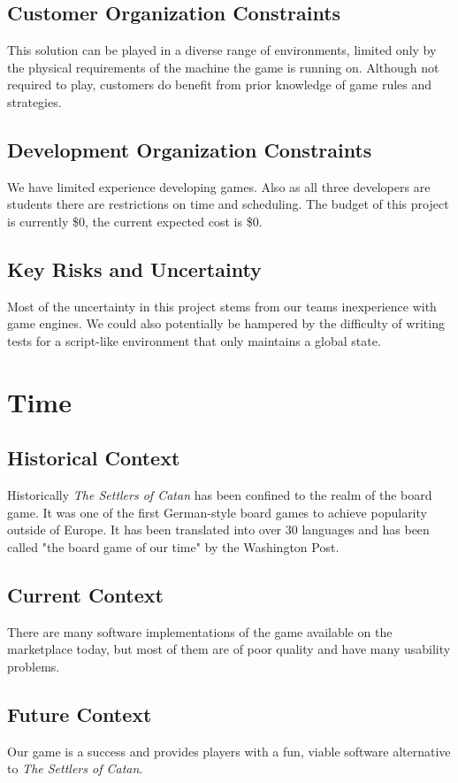 \documentclass[12pt]{article}
\begin{document}
\subsection{Customer Organization Constraints}
This solution can be played in a diverse range of environments, limited only by the physical requirements of the machine the game is running on. Although not required to play, customers do benefit from prior knowledge of game rules and strategies.

\subsection{Development Organization Constraints}
We have limited experience developing games. Also as all three developers are students there are restrictions on time and scheduling. The budget of this project is currently \$0, the current expected cost is \$0.

\subsection{Key Risks and Uncertainty}
Most of the uncertainty in this project stems from our teams inexperience with game engines. We could also potentially be hampered by the difficulty of writing tests for a script-like environment that only maintains a global state. 

\section{Time}

\subsection{Historical Context}
Historically \emph{The Settlers of Catan} has been confined to the realm of the board game. It was one of the first German-style board games to achieve popularity outside of Europe. It has been translated into over 30 languages and has been called "the board game of our time" by the Washington Post.

\subsection{Current Context}
There are many software implementations of the game available on the marketplace today, but most of them are of poor quality and have many usability problems.

\subsection{Future Context}
Our game is a success and provides players with a fun, viable software alternative to \emph{The Settlers of Catan}.
\end{document}
